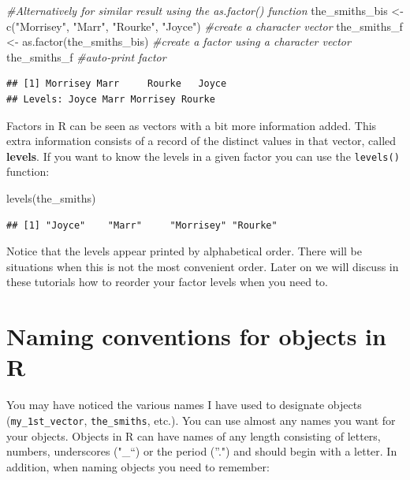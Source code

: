 \documentclass[
]{book}
\newenvironment{Shaded}{\begin{snugshade}}{\end{snugshade}}
\newcommand{\CommentTok}[1]{\textcolor[rgb]{0.56,0.35,0.01}{\textit{#1}}}
\newcommand{\FunctionTok}[1]{\textcolor[rgb]{0.00,0.00,0.00}{#1}}
\newcommand{\NormalTok}[1]{#1}
\newcommand{\OtherTok}[1]{\textcolor[rgb]{0.56,0.35,0.01}{#1}}
\newcommand{\StringTok}[1]{\textcolor[rgb]{0.31,0.60,0.02}{#1}}
\begin{document}
\begin{Shaded}
\begin{Highlighting}[]
\CommentTok{\#Alternatively for similar result using the as.factor() function}
\NormalTok{the\_smiths\_bis }\OtherTok{\textless{}{-}} \FunctionTok{c}\NormalTok{(}\StringTok{"Morrisey"}\NormalTok{, }\StringTok{"Marr"}\NormalTok{, }\StringTok{"Rourke"}\NormalTok{, }\StringTok{"Joyce"}\NormalTok{) }\CommentTok{\#create a character vector}
\NormalTok{the\_smiths\_f }\OtherTok{\textless{}{-}} \FunctionTok{as.factor}\NormalTok{(the\_smiths\_bis) }\CommentTok{\#create a factor using a character vector}
\NormalTok{the\_smiths\_f }\CommentTok{\#auto{-}print factor}
\end{Highlighting}
\end{Shaded}

\begin{verbatim}
## [1] Morrisey Marr     Rourke   Joyce   
## Levels: Joyce Marr Morrisey Rourke
\end{verbatim}

Factors in R can be seen as vectors with a bit more information added. This extra information consists of a record of the distinct values in that vector, called \textbf{levels}. If you want to know the levels in a given factor you can use the \texttt{levels()} function:

\begin{Shaded}
\begin{Highlighting}[]
\FunctionTok{levels}\NormalTok{(the\_smiths)}
\end{Highlighting}
\end{Shaded}

\begin{verbatim}
## [1] "Joyce"    "Marr"     "Morrisey" "Rourke"
\end{verbatim}

Notice that the levels appear printed by alphabetical order. There will be situations when this is not the most convenient order. Later on we will discuss in these tutorials how to reorder your factor levels when you need to.

\hypertarget{naming-conventions-for-objects-in-r}{%
\section{Naming conventions for objects in R}\label{naming-conventions-for-objects-in-r}}

You may have noticed the various names I have used to designate objects (\texttt{my\_1st\_vector}, \texttt{the\_smiths}, etc.). You can use almost any names you want for your objects. Objects in R can have names of any length consisting of letters, numbers, underscores ("\_``) or the period (''.") and should begin with a letter. In addition, when naming objects you need to remember:
\end{document}
